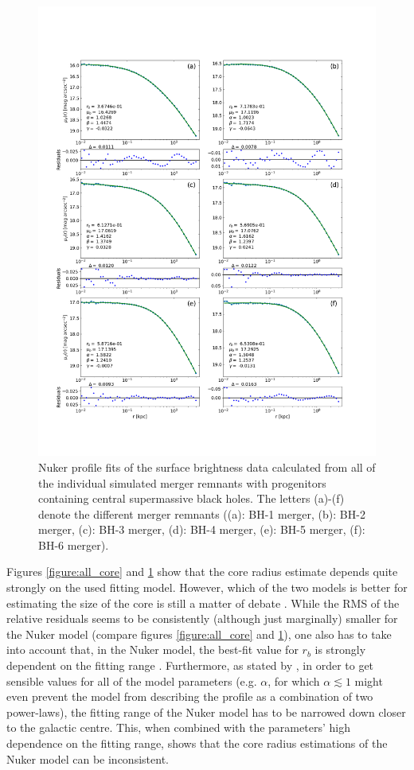 \documentclass[english, oneside]{HYgradu}
\begin{document}
\begin{figure}
	\centering
	\includegraphics[width=\textwidth]{all_nuker_profiles.png}
	\caption{Nuker profile fits of the surface brightness data calculated from all of the individual simulated merger remnants with progenitors containing central supermassive black holes. The letters (a)-(f) denote the different merger remnants ((a): BH-1 merger, (b): BH-2 merger, (c): BH-3 merger, (d): BH-4 merger, (e): BH-5 merger, (f): BH-6 merger).}
	\label{figure:all_nuker}
\end{figure}

Figures \ref{figure:all_core} and \ref{figure:all_nuker} show that the core radius estimate depends quite strongly on the used fitting model. However, which of the two models is better for estimating the size of the core is still a matter of debate \citep{Lauer2007, Dullo2012}. While the RMS of the relative residuals seems to be consistently (although just marginally) smaller for the Nuker model (compare figures \ref{figure:all_core} and \ref{figure:all_nuker}), one also has to take into account that, in the Nuker model, the best-fit value for $r_b$ is strongly dependent on the fitting range \citep{Graham2003}. Furthermore, as stated by \cite{Rantala2018}, in order to get sensible values for all of the model parameters (e.g. $\alpha$, for which $\alpha \lesssim 1$ might even prevent the model from describing the profile as a combination of two power-laws), the fitting range of the Nuker model has to be narrowed down closer to the galactic centre. This, when combined with the parameters' high dependence on the fitting range, shows that the core radius estimations of the Nuker model can be inconsistent.
\end{document}
